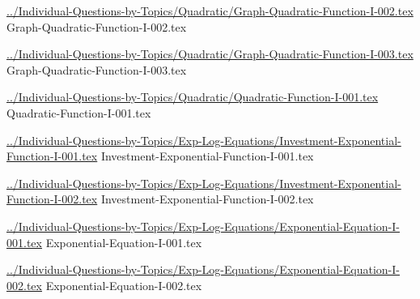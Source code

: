 \documentclass[answer,cancelspace,12pt]{exam}
\begin{document}
\begin{questions}
\question
\href{../Individual-Questions-by-Topics/Quadratic/Graph-Quadratic-Function-I-002.tex}{../Individual-Questions-by-Topics/Quadratic/Graph-Quadratic-Function-I-002.tex}
{Graph-Quadratic-Function-I-002.tex}


\question
\href{../Individual-Questions-by-Topics/Quadratic/Graph-Quadratic-Function-I-003.tex}{../Individual-Questions-by-Topics/Quadratic/Graph-Quadratic-Function-I-003.tex}
{Graph-Quadratic-Function-I-003.tex}

\question
\href{../Individual-Questions-by-Topics/Quadratic/Quadratic-Function-I-001.tex}{../Individual-Questions-by-Topics/Quadratic/Quadratic-Function-I-001.tex}
{Quadratic-Function-I-001.tex}

\question
\href{../Individual-Questions-by-Topics/Exp-Log-Equations/Investment-Exponential-Function-I-001.tex}{../Individual-Questions-by-Topics/Exp-Log-Equations/Investment-Exponential-Function-I-001.tex}
{Investment-Exponential-Function-I-001.tex}


\question
\href{../Individual-Questions-by-Topics/Exp-Log-Equations/Investment-Exponential-Function-I-002.tex}{../Individual-Questions-by-Topics/Exp-Log-Equations/Investment-Exponential-Function-I-002.tex}
{Investment-Exponential-Function-I-002.tex}

\question
\href{../Individual-Questions-by-Topics/Exp-Log-Equations/Exponential-Equation-I-001.tex}{../Individual-Questions-by-Topics/Exp-Log-Equations/Exponential-Equation-I-001.tex}
{Exponential-Equation-I-001.tex}

\question
\href{../Individual-Questions-by-Topics/Exp-Log-Equations/Exponential-Equation-I-002.tex}{../Individual-Questions-by-Topics/Exp-Log-Equations/Exponential-Equation-I-002.tex}
{Exponential-Equation-I-002.tex}



\end{questions}
\end{document}
